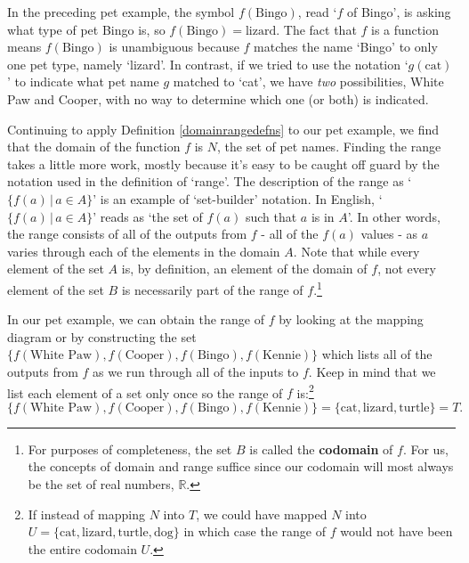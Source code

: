 In the preceding pet example, the symbol $f(\text{Bingo})$, read `$f$ of Bingo', is asking what type of pet Bingo is, so $f(\text{Bingo}) = \text{lizard}$.  The fact that $f$ is a function means $f(\text{Bingo})$ is unambiguous because $f$ matches the name `Bingo' to only one pet type, namely `lizard'. In contrast, if we tried to use the notation `$g(\text{cat})$' to indicate what pet name $g$ matched to `cat', we have \textit{two} possibilities, White Paw and Cooper, with no way to determine which one (or both) is indicated.  

Continuing to apply Definition \ref{domainrangedefns} to our pet example, we find that the domain of the function $f$ is $N$, the set of pet names.  Finding the range takes a little more work, mostly because it's easy to be caught off guard by the notation used in the definition of `range'.  The description of the range as `$\{ f(a) \, | \, a \in A \}$' is an example of `set-builder' notation.  In English,  `$\{ f(a) \, | \, a \in A \}$'  reads as `the set of $f(a)$ such that $a$ is in $A$'.  In other words, the range consists of all of the outputs from $f$ - all of the $f(a)$ values - as $a$ varies through each of the elements in the domain $A$.   Note that while every element of the set $A$ is, by definition, an element of the domain of $f$, not every element of the set $B$ is necessarily part of the range of $f$.\footnote{For purposes of completeness, the set $B$ is called the  \textbf{codomain} of $f$.  For us, the concepts of domain and range suffice since our codomain will most always be the set of real numbers, $\mathbb{R}$.}

In our pet example, we can obtain the range of $f$  by looking at the mapping diagram or by constructing the set $\{ f(\text{White Paw}), f(\text{Cooper}), f(\text{Bingo}), f(\text{Kennie}) \}$ which lists all of the outputs from $f$ as we run through all of the inputs to $f$.   Keep in mind that we list each element of a set only once so the range of $f$ is:\footnote{If instead of mapping $N$ into $T$, we could have mapped $N$ into $U=\{ \text{cat}, \text{lizard}, \text{turtle}, \text{dog}\}$ in which case the range of $f$ would not have been the entire codomain $U$.}  \[ \{ f(\text{White Paw}), f(\text{Cooper}), f(\text{Bingo}), f(\text{Kennie}) \} = \{ \text{cat}, \text{lizard}, \text{turtle} \} = T.\] 


